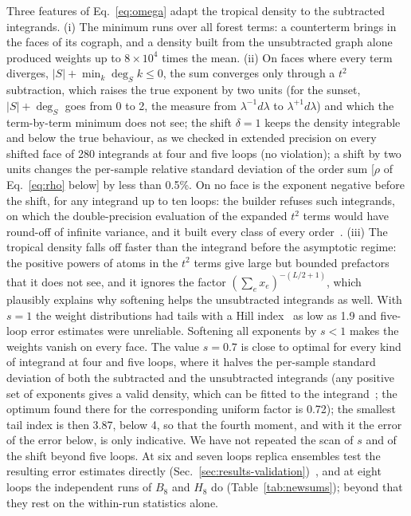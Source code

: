 Three features of Eq.~\eqref{eq:omega} adapt the tropical density to the subtracted integrands. (i) The minimum runs over
all forest terms: a counterterm brings in the faces of its cograph, and a density built from the unsubtracted graph alone
produced weights up to $8\times10^4$ times the mean. (ii) On faces where every term diverges, $|S|+\min_k\deg_S k\le0$, the
sum converges only through a $t^2$ subtraction, which raises the true exponent by two units (for the sunset, $|S|+\deg_S$ goes from 0
to 2, the measure from $\lambda^{-1}d\lambda$ to $\lambda^{+1}d\lambda$) and which the term-by-term minimum does not see; the shift $\delta=1$ keeps the density
integrable and below the true behaviour, as we checked in extended precision on every shifted face of 280 integrands at
four and five loops (no violation); a shift by two units changes the per-sample relative standard deviation of the order sum [$\rho$ of Eq.~\eqref{eq:rho}
below] by less than 0.5\%. On no face is the exponent negative before the shift, for any integrand up to ten loops: the builder refuses such
integrands, on which the double-precision evaluation of the expanded $t^2$ terms would have round-off of infinite variance,
and it built every class of every order~. (iii) The tropical density falls off faster than the integrand before the
asymptotic regime: the positive powers of atoms in the $t^2$ terms give large but bounded prefactors that it does not see,
and it ignores the factor $(\sum_e x_e)^{-(L/2+1)}$, which plausibly explains why softening helps the unsubtracted
integrands as well. With $s=1$ the weight distributions had tails with a Hill index~\cite{Hill1975}
as low as 1.9 and five-loop error estimates were unreliable. Softening all exponents by $s<1$ makes the weights vanish on
every face. The value $s=0.7$ is close to optimal for every kind of integrand at four and five loops, where it halves the
per-sample standard deviation of both the subtracted and the unsubtracted integrands (any positive set of exponents
gives a valid density, which can be fitted to the integrand~\cite{Salvatori2025}; the optimum found there for the
corresponding uniform factor is 0.72); the smallest tail index is then 3.87,
below 4, so that the fourth moment, and with it the error of the error below, is only indicative. We have not repeated
the scan of $s$ and of the shift beyond five loops. At six and seven loops replica ensembles test the resulting error
estimates directly (Sec.~\ref{sec:results-validation})~, and at eight loops the independent runs of $B_8$ and
$H_8$ do (Table~\ref{tab:newsums}); beyond that they rest on the within-run statistics alone.

